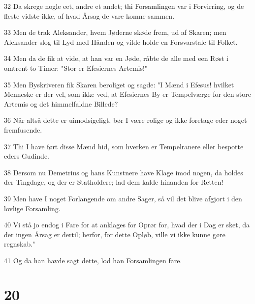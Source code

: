 \par 32 Da skrege nogle eet, andre et andet; thi Forsamlingen var i Forvirring, og de fleste vidste ikke, af hvad Årsag de vare komne sammen.
\par 33 Men de trak Aleksander, hvem Jøderne skøde frem, ud af Skaren; men Aleksander slog til Lyd med Hånden og vilde holde en Forsvarstale til Folket.
\par 34 Men da de fik at vide, at han var en Jøde, råbte de alle med een Røst i omtrent to Timer: "Stor er Efesiernes Artemis!"
\par 35 Men Byskriveren fik Skaren beroliget og sagde: "I Mænd i Efesus! hvilket Menneske er der vel, som ikke ved, at Efesiernes By er Tempelværge for den store Artemis og det himmelfaldne Billede?
\par 36 Når altså dette er uimodsigeligt, bør I være rolige og ikke foretage eder noget fremfusende.
\par 37 Thi I have ført disse Mænd hid, som hverken er Tempelranere eller bespotte eders Gudinde.
\par 38 Dersom nu Demetrius og hans Kunstnere have Klage imod nogen, da holdes der Tingdage, og der er Statholdere; lad dem kalde hinanden for Retten!
\par 39 Men have I noget Forlangende om andre Sager, så vil det blive afgjort i den lovlige Forsamling.
\par 40 Vi stå jo endog i Fare for at anklages for Oprør for, hvad der i Dag er sket, da der ingen Årsag er dertil; herfor, for dette Opløb, ville vi ikke kunne gøre regnskab."
\par 41 Og da han havde sagt dette, lod han Forsamlingen fare.

\chapter{20}


